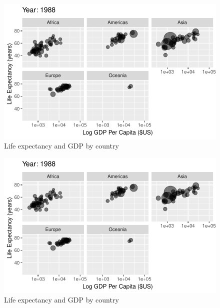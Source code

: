 \documentclass[
  letterpaper,
  DIV=11,
  numbers=noendperiod]{scrreport}
\theoremstyle{definition}
\theoremstyle{remark}
\begin{document}
\begin{figure}

{\centering \includegraphics{index_files/figure-pdf/fig-anim-lifegdp-65.pdf}

}

\caption{\label{fig-anim-lifegdp-65}Life expectancy and GDP by country}

\end{figure}

\begin{figure}

{\centering \includegraphics{index_files/figure-pdf/fig-anim-lifegdp-66.pdf}

}

\caption{\label{fig-anim-lifegdp-66}Life expectancy and GDP by country}

\end{figure}
\end{document}
